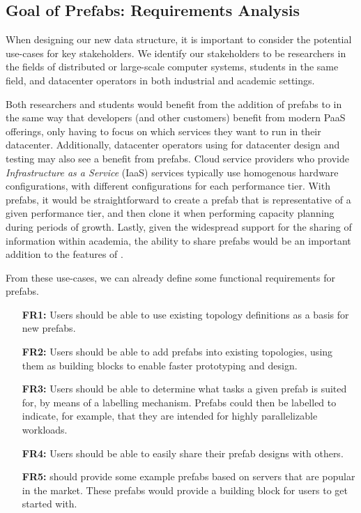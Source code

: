 \documentclass[11pt]{article}
\begin{document}
	\subsection{Goal of Prefabs: Requirements Analysis}
		When designing our new data structure, it is important to consider the potential use-cases for key stakeholders.
		We identify our stakeholders to be researchers in the fields of distributed or large-scale computer systems, students in the same field, and datacenter operators in both industrial and academic settings.

		Both researchers and students would benefit from the addition of prefabs to \opendc{} in the same way that developers (and other customers) benefit from modern PaaS offerings, only having to focus on which services they want to run in their datacenter.
		Additionally, datacenter operators using \opendc{} for datacenter design and testing may also see a benefit from prefabs. 
		Cloud service providers who provide \textit{Infrastructure as a Service} (IaaS) services typically use homogenous hardware configurations, with different configurations for each performance tier. 
		With prefabs, it would be straightforward to create a prefab that is representative of a given performance tier, and then clone it when performing capacity planning during periods of growth.
		Lastly, given the widespread support for the sharing of information within academia, the ability to share prefabs would be an important addition to the features of \opendc{}.

		From these use-cases, we can already define some functional requirements for prefabs.
		\begin{itemize}
			\item [\textbf{FR1:}] Users should be able to use existing topology definitions as a basis for new prefabs.
			\item [\textbf{FR2:}] Users should be able to add prefabs into existing topologies, using them as building blocks to enable faster prototyping and design.
			\item [\textbf{FR3:}] Users should be able to determine what tasks a given prefab is suited for, by means of a labelling mechanism. Prefabs could then be labelled to indicate, for example, that they are intended for highly parallelizable workloads.
			\item [\textbf{FR4:}] Users should be able to easily share their prefab designs with others.
			\item [\textbf{FR5:}] \opendc{} should provide some example prefabs based on servers that are popular in the market. These prefabs would provide a building block for users to get started with.
		\end{itemize}
\end{document}

